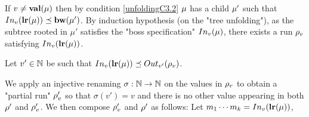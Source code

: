 	If $v \neq \mathbf{val}(\mu)$ then by condition \ref{unfoldingC3.2} $\mu$ has a child $\mu'$ such that $\vinput{v}{\localrunlabel{\mu}} \subword  \bosslabel{\node'}$.
	By induction hypothesis (on the "tree unfolding"), as the subtree rooted in $\mu'$ satisfies the "boss specification" $\vinput{v}{\mu}$, there exists a run $\rho_v$ satisfying $\vinput{v}{\localrunlabel{\mu}}$.
	
	Let $v' \in \mathbb{N}$ be such that $\vinput{v}{\localrunlabel{\node}} \subword \voutput{v'}{\run_v}$. 
	
	We apply an injective renaming $\sigma : \mathbb{N} \to \mathbb{N}$ on the values in $\rho_v$ to obtain a "partial run" $\rho'_v$ so that $\sigma(v') = v$ and there is no other value appearing in both $\rho'$ and $\rho'_v$. 
	We then compose $\rho'_v$ and $\rho'$ as follows: Let $m_1\cdots m_k = \vinput{v}{\localrunlabel{\node}}$, 
	
	
	
	
	
	
	
	
	
	
%	
%	
%	
%	
